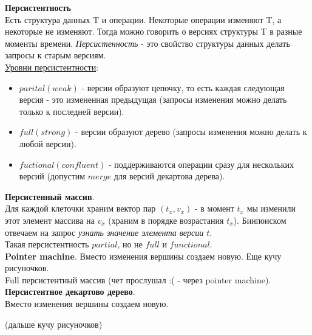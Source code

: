\documentclass{article}
\newcommand{\tu}[1]{\underline{#1}}
\newcommand{\tb}[1]{\textbf{#1}}
\newcommand{\ti}[1]{\textit{#1}}
\begin{document}
{\Large\tb{Персистентность}} \\

Есть структура данных T и операции. Некоторые операции изменяют T, а некоторые не изменяют. Тогда можно говорить о версиях структуры T в разные моменты времени. \ti{Персистенность} - это свойство структуры данных делать запросы к старым версиям. \\

\tu{Уровни персистентности}:

\begin{itemize}

\item $parital (weak)$ - версии образуют цепочку, то есть каждая следующая версия - это измененная предыдущая (запросы изменения можно делать только к последней версии). \\
\item $full (strong)$ - версии образуют дерево (запросы изменения можно делать к любой версии). \\
\item  $fuctional (confluent)$ - поддерживаются операции сразу для нескольких версий (допустим $merge$ для версий декартова дерева). \\

\end{itemize} 

\tb{Персистенный массив}. \\

Для каждой клеточки храним вектор пар $(t_x, v_x)$ - в момент $t_x$ мы изменили этот элемент массива на $v_x$ (храним в порядке возрастания $t_x$). Бинпоиском отвечаем на запрос \ti{узнать значение элемента версии $t$}. \\

Такая персистентность $partial$, но не $full$ и $functional$. \\



\tb{Pointer machine}. Вместо изменения вершины создаем новую. Еще кучу рисуночков. \\

Full персистентный массив (чет прослушал :( - через pointer machine). \\



\tb{Персистентное декартово дерево}. \\

Вместо изменения вершины создаем новую.

(дальше кучу рисуночков)
\end{document}
